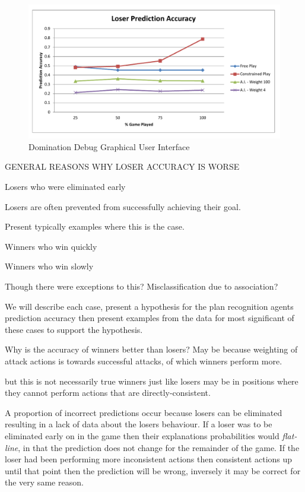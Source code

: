 \documentclass[parskip]{cs4rep}
\begin{document}
\begin{figure}[h]
\centerline{
\includegraphics[width=\textwidth]{images/loser-graph.pdf}
}
\caption{Domination Debug Graphical User Interface}
\label{fig:dom-debug-gui}
\end{figure} 

GENERAL REASONS WHY LOSER ACCURACY IS WORSE

Losers who were eliminated early

Losers are often prevented from successfully achieving their goal.

Present typically examples where this is the case.

Winners who win quickly

Winners who win slowly

Though there were exceptions to this? Misclassification due to association?

We will describe each case, present a hypothesis for the plan recognition agents prediction accuracy then present examples from the data for most significant of these cases to support the hypothesis. 

Why is the accuracy of winners better than losers? May be because weighting of attack actions is towards successful attacks, of which winners perform more.

but this is not necessarily true winners just like losers may be in positions where they cannot perform actions that are directly-consistent.

A proportion of incorrect predictions occur because losers can be eliminated resulting in a lack of data about the losers behaviour. If a loser was to be eliminated early on in the game then their explanations probabilities would \textit{flat-line}, in that the prediction does not change for the remainder of the game. If the loser had been performing more inconsistent actions then consistent actions up until that point then the prediction will be wrong, inversely it may be correct for the very same reason.
\end{document}
